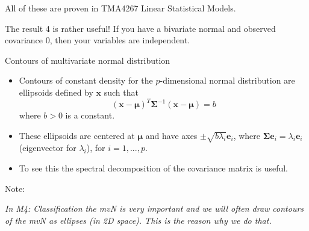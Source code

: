 \documentclass[
  ignorenonframetext,
]{beamer}
\begin{document}
\begin{frame}
All of these are proven in TMA4267 Linear Statistical Models.

The result 4 is rather useful! If you have a bivariate normal and
observed covariance 0, then your variables are independent.
\end{frame}

\begin{frame}
\begin{block}{Contours of multivariate normal distribution}
\protect\hypertarget{contours-of-multivariate-normal-distribution}{}
\vspace{2mm}

\begin{itemize}
\item
  Contours of constant density for the \(p\)-dimensional normal
  distribution are ellipsoids defined by \(\boldsymbol{x}\) such that
  \[ (\boldsymbol{x}-\boldsymbol{\mu})^T\boldsymbol\Sigma^{-1}(\boldsymbol{x}-\boldsymbol{\mu})=b \]
  where \(b>0\) is a constant.
\item
  These ellipsoids are centered at \(\boldsymbol{\mu}\) and have axes
  \(\pm \sqrt{b \lambda_i}\boldsymbol{e}_i\), where
  \(\boldsymbol\Sigma\boldsymbol{e}_i=\lambda_i \boldsymbol{e}_i\)
  (eigenvector for \(\lambda_i\)), for \(i=1,...,p\).
\item
  To see this the spectral decomposition of the covariance matrix is
  useful.
\end{itemize}
\end{block}
\end{frame}

\begin{frame}
Note:

\emph{In M4: Classification the mvN is very important and we will often
draw contours of the mvN as ellipses (in 2D space). This is the reason
why we do that. }
\end{frame}
\end{document}
